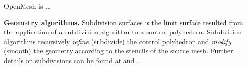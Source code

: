 

OpenMesh \cite{Botsch:2002:OPENMESH} is ...

\noindent \textbf{Geometry algorithms.}
Subdivision surfaces \cite{cc,ds,loop,sqrt3,qts}
is the limit surface resulted from the
application of a subdivision algorithm to a control polyhedron.
Subdivision algorithms recursively \emph{refine} (subdivide) the
control polyhedron and \emph{modify} (smooth) the geometry according
to the stencils of the source mesh.  
Further details on subdivisions can be found at \cite{Sub:course:2000}
and \cite{Warren:subdivision}.
